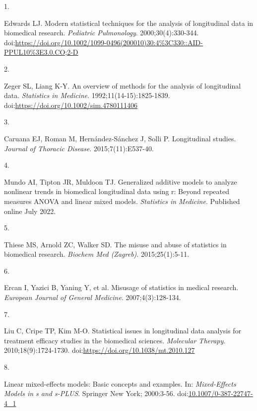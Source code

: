 \documentclass[
]{article}
\newlength{\cslhangindent}
\newlength{\csllabelwidth}
\newlength{\cslentryspacingunit} %
\newenvironment{CSLReferences}[2] %
 {%
  \setlength{\parindent}{0pt}
  \ifodd #1
  \let\oldpar\par
  \def\par{\hangindent=\cslhangindent\oldpar}
  \fi
  \setlength{\parskip}{#2\cslentryspacingunit}
 }%
 {}
\newcommand{\CSLLeftMargin}[1]{\parbox[t]{\csllabelwidth}{#1}}
\newcommand{\CSLRightInline}[1]{\parbox[t]{\linewidth - \csllabelwidth}{#1}\break}
\begin{document}
\hypertarget{refs}{}
\begin{CSLReferences}{0}{0}
\leavevmode{}%
\CSLLeftMargin{1. }%
\CSLRightInline{Edwards LJ. Modern statistical techniques for the
analysis of longitudinal data in biomedical research. \emph{Pediatric
Pulmonology}. 2000;30(4):330-344.
doi:\url{https://doi.org/10.1002/1099-0496(200010)30:4\%3C330::AID-PPUL10\%3E3.0.CO;2-D}}

\leavevmode{}%
\CSLLeftMargin{2. }%
\CSLRightInline{Zeger SL, Liang K-Y. An overview of methods for the
analysis of longitudinal data. \emph{Statistics in Medicine}.
1992;11(14-15):1825-1839.
doi:\url{https://doi.org/10.1002/sim.4780111406}}

\leavevmode{}%
\CSLLeftMargin{3. }%
\CSLRightInline{Caruana EJ, Roman M, Hernández-Sánchez J, Solli P.
Longitudinal studies. \emph{Journal of Thoracic Disease}.
2015;7(11):E537-40.}

\leavevmode{}%
\CSLLeftMargin{4. }%
\CSLRightInline{Mundo AI, Tipton JR, Muldoon TJ. Generalized additive
models to analyze nonlinear trends in biomedical longitudinal data using
r: Beyond repeated measures {ANOVA} and linear mixed models.
\emph{Statistics in Medicine}. Published online July 2022.}

\leavevmode{}%
\CSLLeftMargin{5. }%
\CSLRightInline{Thiese MS, Arnold ZC, Walker SD. The misuse and abuse of
statistics in biomedical research. \emph{Biochem Med (Zagreb)}.
2015;25(1):5-11.}

\leavevmode{}%
\CSLLeftMargin{6. }%
\CSLRightInline{Ercan I, Yazici B, Yaning Y, et al. Misusage of
statistics in medical research. \emph{European Journal of General
Medicine}. 2007;4(3):128-134.}

\leavevmode{}%
\CSLLeftMargin{7. }%
\CSLRightInline{Liu C, Cripe TP, Kim M-O. Statistical issues in
longitudinal data analysis for treatment efficacy studies in the
biomedical sciences. \emph{Molecular Therapy}. 2010;18(9):1724-1730.
doi:\url{https://doi.org/10.1038/mt.2010.127}}

\leavevmode{}%
\CSLLeftMargin{8. }%
\CSLRightInline{Linear mixed-effects models: Basic concepts and
examples. In: \emph{Mixed-Effects Models in s and s-PLUS}. Springer New
York; 2000:3-56.
doi:\href{https://doi.org/10.1007/0-387-22747-4_1}{10.1007/0-387-22747-4\_1}}


\end{CSLReferences}
\end{document}

